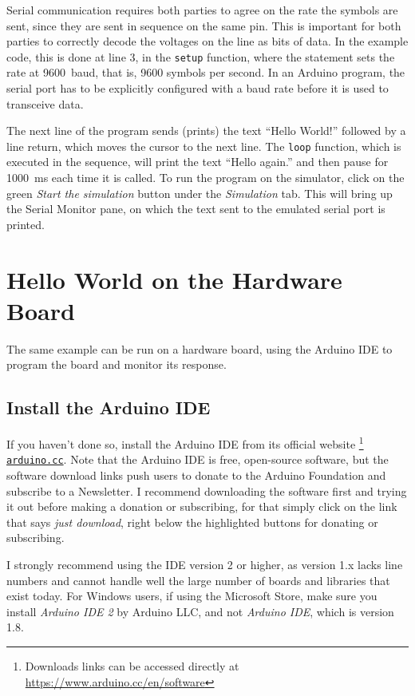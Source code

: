 Serial communication requires both parties to agree on the rate the symbols are sent, since they are sent in sequence on the same pin.
This is important for both parties to correctly decode the voltages on the line as bits of data.
In the example code, this is done at line 3, in the \texttt{setup} function, where the statement  sets the rate at \SI{9600}{baud}, that is, \num{9600} symbols per second.
In an Arduino program, the serial port has to be explicitly configured with a baud rate before it is used to transceive data.

The next line of the program sends (prints) the text ``Hello World!'' followed by a line return, which moves the cursor to the next line.
The \texttt{loop} function, which is executed in the sequence, will print the text ``Hello again.'' and then pause for \SI{1000}{ms} each time it is called.
To run the program on the simulator, click on the green \emph{Start the simulation} button under the \emph{Simulation} tab.
This will bring up the Serial Monitor pane, on which the text sent to the emulated serial port is printed.

\section{Hello World on the Hardware Board}

The same example can be run on a hardware board, using the Arduino IDE to program the board and monitor its response.

\subsection{Install the Arduino IDE}
If you haven't done so, install the Arduino IDE from its official website%
\footnote{Downloads links can be accessed directly at \url{https://www.arduino.cc/en/software}}
\texttt{\href{https://www.arduino.cc/en/software}{arduino.cc}}.
Note that the Arduino IDE is free, open-source software, but the software download links push users to donate to the Arduino Foundation and subscribe to a Newsletter.
I recommend downloading the software first and trying it out before making a donation or subscribing, for that simply click on the link that says \emph{just download}, right below the highlighted buttons for donating or subscribing.

I strongly recommend using the IDE version 2 or higher, as version 1.x lacks line numbers and cannot handle  well the large number of boards and libraries that exist today.
For Windows users, if using the Microsoft Store, make sure you install \emph{Arduino IDE 2} by Arduino LLC, and not \emph{Arduino IDE}, which is version 1.8.

